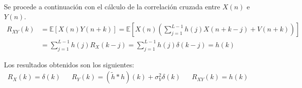 Se procede a continuación con el cálculo de la correlación cruzada entre $X(n)$ e $Y(n)$.
\begin{align*}
    R_{XY}(k) &= \mathbb{E}[X(n)Y(n+k)] = \mathbb{E}\left[X(n)\left(\sum_{j=1}^{L-1} h(j)X(n + k - j) + V(n+k)\right)\right]\\
    &= \sum_{j=1}^{L-1} h(j) R_X(k-j) = \sum_{j=1}^{L-1} h(j) \delta(k-j) = h(k)
\end{align*}

Los resultados obtenidos son los siguientes:
\begin{align*}
    \boxed{R_X(k) = \delta(k)} &&
    \boxed{R_Y(k) = (\tilde{h} * h)(k) + \sigma_V^2 \delta(k)} &&
    \boxed{R_{XY}(k) = h(k)}
\end{align*}
